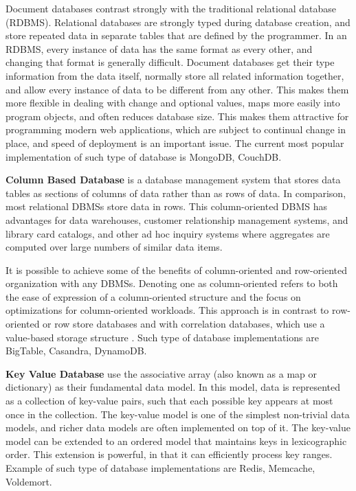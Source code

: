 Document databases contrast strongly with the traditional relational database (RDBMS). Relational databases are strongly typed during database creation, and store repeated data in separate tables that are defined by the programmer. In an RDBMS, every instance of data has the same format as every other, and changing that format is generally difficult. Document databases get their type information from the data itself, normally store all related information together, and allow every instance of data to be different from any other. This makes them more flexible in dealing with change and optional values, maps more easily into program objects, and often reduces database size. This makes them attractive for programming modern web applications, which are subject to continual change in place, and speed of deployment is an important issue. The current most popular implementation of such type of database is MongoDB, CouchDB.

\textbf{Column Based Database} is a database management system that stores data tables as sections of columns of data rather than as rows of data. In comparison, most relational DBMSs store data in rows. This column-oriented DBMS has advantages for data warehouses, customer relationship management systems, and library card catalogs, and other ad hoc inquiry systems where aggregates are computed over large numbers of similar data items.

It is possible to achieve some of the benefits of column-oriented and row-oriented organization with any DBMSs. Denoting one as column-oriented refers to both the ease of expression of a column-oriented structure and the focus on optimizations for column-oriented workloads. This approach is in contrast to row-oriented or row store databases and with correlation databases, which use a value-based storage structure \cite{wiki_column_based_db}. Such type of database implementations are BigTable, Casandra, DynamoDB.

\textbf{Key Value Database} use the associative array (also known as a map or dictionary) as their fundamental data model. In this model, data is represented as a collection of key-value pairs, such that each possible key appears at most once in the collection. The key-value model is one of the simplest non-trivial data models, and richer data models are often implemented on top of it. The key-value model can be extended to an ordered model that maintains keys in lexicographic order. This extension is powerful, in that it can efficiently process key ranges. Example of such type of database implementations are Redis, Memcache, Voldemort.

